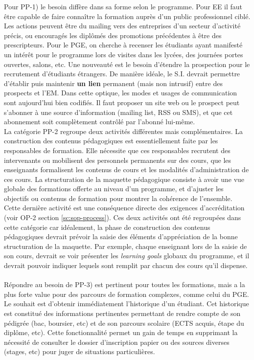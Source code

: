 \documentclass{book}
\begin{document}
Pour PP-1) le besoin diffère dans sa forme selon le programme. Pour EE il faut 
être capable de faire connaître la formation auprès d'un public professionnel 
ciblé. Les actions peuvent être du mailing vers des entreprises d'un secteur 
d'activité précis, ou encouragés les diplômés des promotions précédentes à être 
des prescripteurs. Pour le PGE, on cherche à recenser les étudiants ayant manifesté 
un intérêt pour le programme lors de visites dans les lycées, des journées portes 
ouvertes, salons, etc. Une nouveauté est le besoin d'étendre la prospection pour 
le recrutement d'étudiants étrangers. 
De manière idéale, le S.I. devrait permettre d'établir puis maintenir \textbf{un 
lien} permanent (mais non intrusif) entre des prospects et l'EM. Dans cette optique, 
les modes et usages de communication sont aujourd'hui bien codifiés. Il faut proposer 
un site web ou le prospect peut s'abonner à une source d'information (mailing list,
RSS ou SMS), et que cet abonnement soit complètement contrôlé par l'abonné lui-même.
~\\


La catégorie PP-2 regroupe deux activités différentes mais complémentaires. La 
construction des contenus pédagogiques est essentiellement faite par les responsables de 
formation. Elle nécessite que ces responsables recrutent des intervenants ou mobilisent 
des personnels permanents sur des cours, que les enseignants formalisent les contenus de 
cours et les modalités d'administration de ces cours. La structuration de la maquette 
pédagogique consiste à avoir une vue globale des formations offerte au niveau d'un 
programme, et d'ajuster les objectifs ou contenus de formation pour montrer la cohérence 
de l'ensemble. Cette dernière activité est une conséquence directe des exigences 
d'accréditation (voir OP-2 section \ref{sc:sop-process}). Ces deux activités ont été
regroupées dans cette catégorie car idéalement, la phase de construction des contenus 
pédagogiques devrait prévoir la saisie des éléments d'appréciation de la bonne structuration
de la maquette. Par exemple, chaque enseignant lors de la saisie de son cours, devrait se
voir présenter les \emph{learning goals} globaux du programme, et il devrait pouvoir 
indiquer lequels sont remplit par chacun des cours qu'il dispense.
~\\

Répondre au besoin de  PP-3) est pertinent pour toutes les formations, mais
a la plus forte value pour des parcours de formation complexes, comme celui du PGE.
Le souhait est d'obtenir immédiatement l'historique d'un étudiant. Cet historique
est constitué des informations pertinentes permettant de rendre compte de son pédigrée
(bac, boursier, etc)  et de son parcours scolaire (ECTS acquis, étape du diplôme, etc).
Cette fonctionnalité permet un gain de temps en supprimant la nécessité de consulter
le dossier d'inscription papier ou des sources diverses (stages, etc) pour juger
de situations particulières.
~\\
\end{document}
